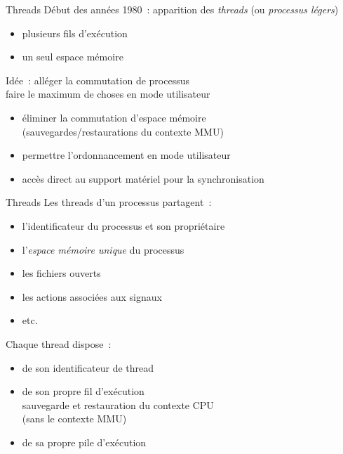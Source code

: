 \begin {frame} {Threads}
    Début des années 1980~: apparition des \emph {threads} (ou \emph
    {processus légers})

    \begin {itemize}
	\item plusieurs fils d'exécution
	\item un seul espace mémoire
    \end {itemize}

    \vspace* {3mm}

    Idée~: alléger la commutation de processus \\
    \implique faire le maximum de choses en mode utilisateur

    \begin {itemize}
	\item éliminer la commutation d'espace mémoire \\
	    (sauvegardes/restaurations du contexte MMU)
	\item permettre l'ordonnancement en mode utilisateur
	\item accès direct au support matériel pour la
	    synchronisation
    \end {itemize}

\end {frame}

\begin {frame} {Threads}
    Les threads d'un processus partagent~:
    \begin {itemize}
	\item l'identificateur du processus et son propriétaire
	\item l'\emph {espace mémoire unique} du processus
	\item les fichiers ouverts
	\item les actions associées aux signaux
	\item etc.
    \end {itemize}

    Chaque thread dispose~:
    \begin {itemize}
	\item de son identificateur de thread
	\item de son propre fil d'exécution \\
	    \implique sauvegarde et restauration du contexte CPU \\
	    (sans le contexte MMU)
	\item de sa propre pile d'exécution
    \end {itemize}

\end {frame}

